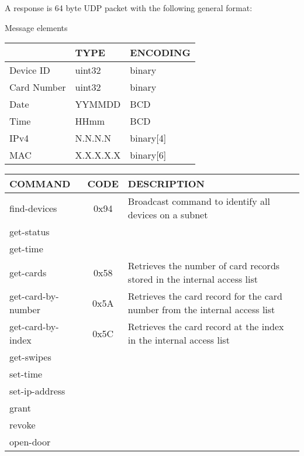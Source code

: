 \documentclass[11pt, oneside]{article}
\begin{document}
A response is 64 byte UDP packet with the following general format:

{ 
}

Message elements

{ \begin{tabular}{ | l | l | l | }
   \hline
   & TYPE & ENCODING \\ 
   \hline
   Device ID & uint32 & binary \\ 
   \hline
   Card Number & uint32 & binary \\ 
   \hline
   Date & YYMMDD & BCD \\ 
   \hline
   Time & HHmm & BCD \\ 
   \hline
   IPv4  & N.N.N.N & binary[4] \\ 
   \hline
   MAC  & X.X.X.X.X & binary[6] \\ 
   \hline
   \end{tabular}
   \vspace{0.5cm}
}


{ \begin{tabular}{ | l | c | l | }
   \hline
   COMMAND & CODE & DESCRIPTION \\ 
   \hline
   find-devices & 0x94 &  Broadcast command to identify all devices on a subnet \\ 
   \hline
   get-status &  &  \\ 
   \hline
   get-time &  &  \\ 
   \hline
   get-cards & 0x58  &  Retrieves the number of card records stored in the internal access list \\ 
   \hline
   get-card-by-number & 0x5A &  Retrieves the card record for the card number from the internal access list \\ 
   \hline
   get-card-by-index & 0x5C &  Retrieves the card record at the index in the internal access list \\ 
   \hline
   get-swipes &  &  \\
   \hline
   set-time &  &  \\
   \hline
   set-ip-address &  &  \\
   \hline
   grant &  &  \\
   \hline
   revoke &  &  \\ 
   \hline
   open-door &  &  \\ 
   \hline
   \end{tabular}
   \vspace{0.5cm}
}
\end{document}
